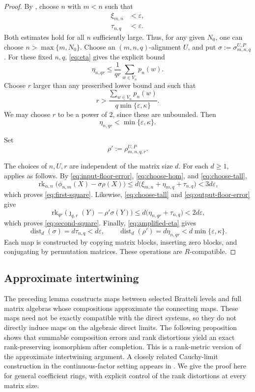 \documentclass[11pt]{amsart}
\DeclareMathOperator{\rk}{rk}
\theoremstyle{definition}
\theoremstyle{remark}
\begin{document}
\begin{proof}
By , choose $n$ with $m<n$ such that
\begin{align}
 \xi_{m,n}&<\varepsilon,
 \label{eq:choose-hom}\\
 \tau_{n,q}&<\varepsilon.
 \label{eq:choose-tall}
\end{align}
Both estimates hold for all \(n\) sufficiently large.
Thus, for any given  $N_0$, one can choose $n>\max\{m,N_0\}$.
Choose an $(m,n,q)$-alignment $U$, and put \(\sigma:=\sigma_{m,n,q}^{U,P}\).
For these fixed $n,q$, \eqref{eq:eta} gives the explicit bound
\[
 \eta_{n,qr}\leq\frac1{qr}\sum_{w\in V_n}p_n(w).
\]
Choose $r$ larger than any prescribed lower bound and such that
\[
 r>\frac{\sum_{w\in V_n}p_n(w)}{q\min\{\varepsilon,\kappa\}}.
\]
We may choose $r$ to be a power of $2$, since these are unbounded.
Then
\begin{equation}\label{eq:output-floor-error}
 \eta_{n,qr}<\min\{\varepsilon,\kappa\}.
\end{equation}

Set
\[
 \rho':=\rho_{m,n,q,r}^{U,P}.
\]

The choices of $n,U,r$ are independent of the matrix size $d$.
For each $d\geq1$,  applies as follows.
By \eqref{eq:input-floor-error}, \eqref{eq:choose-hom}, and
\eqref{eq:choose-tall},
\[
 \rk_{\alpha,n}\bigl(\phi_{n,m}(X)-\sigma\rho(X)\bigr)
 \leq d\bigl(\xi_{m,n}+\eta_{m,q}+\tau_{n,q}\bigr)
 <3d\varepsilon,
\]
which proves \eqref{eq:first-square}.
Likewise, \eqref{eq:choose-tall} and \eqref{eq:output-floor-error} give
\[
 \rk_{qr}\bigl(\jmath_{q,r}(Y)-\rho'\sigma(Y)\bigr)
 \leq d\bigl(\eta_{n,qr}+\tau_{n,q}\bigr)
 <2d\varepsilon,
\]
which proves \eqref{eq:second-square}.
Finally, \eqref{eq:amplified-eta} gives
\[
 \operatorname{dist}_d(\sigma)=d\tau_{n,q}<d\varepsilon,
 \qquad
 \operatorname{dist}_d(\rho')=d\eta_{n,qr}
 <d\min\{\varepsilon,\kappa\}.
\]
Each map is constructed by copying matrix blocks, inserting zero
blocks, and conjugating by permutation matrices.  These operations
are $R$-compatible.
\end{proof}

\subsection{Approximate intertwining}
The preceding lemma constructs maps between selected Bratteli levels
and full matrix algebras whose compositions approximate the connecting
maps.  These maps need not be exactly compatible with the direct systems,
so they do not directly induce maps on the algebraic direct limits.
The following proposition shows that summable composition errors and rank
distortions yield an exact rank-preserving isomorphism after completion.
This is a rank-metric version of the approximate intertwining argument.
A closely related Cauchy-limit construction in the continuous-factor setting
appears in \cite[Lemma~2.4]{AraClaramunt2018}.
We give the proof here for general coefficient rings, with explicit control
of the rank distortions at every matrix size.
\end{document}
